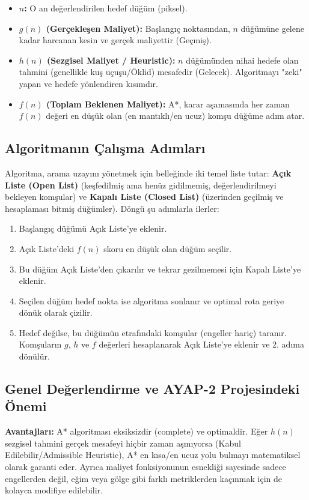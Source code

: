 \documentclass[12pt,a4paper]{article}
\begin{document}
\begin{itemize}
    \item \textbf{$n$:} O an değerlendirilen hedef düğüm (piksel).
    \item \textbf{$g(n)$ (Gerçekleşen Maliyet):} Başlangıç noktasından, $n$ düğümüne gelene kadar harcanan kesin ve gerçek maliyettir (Geçmiş).
    \item \textbf{$h(n)$ (Sezgisel Maliyet / Heuristic):} $n$ düğümünden nihai hedefe olan tahmini (genellikle kuş uçuşu/Öklid) mesafedir (Gelecek). Algoritmayı "zeki" yapan ve hedefe yönlendiren kısımdır.
    \item \textbf{$f(n)$ (Toplam Beklenen Maliyet):} A*, karar aşamasında her zaman $f(n)$ değeri en düşük olan (en mantıklı/en ucuz) komşu düğüme adım atar.
\end{itemize}

\subsection{Algoritmanın Çalışma Adımları}
Algoritma, arama uzayını yönetmek için belleğinde iki temel liste tutar: \textbf{Açık Liste (Open List)} (keşfedilmiş ama henüz gidilmemiş, değerlendirilmeyi bekleyen komşular) ve \textbf{Kapalı Liste (Closed List)} (üzerinden geçilmiş ve hesaplaması bitmiş düğümler). Döngü şu adımlarla ilerler:
\begin{enumerate}
    \item Başlangıç düğümü Açık Liste'ye eklenir.
    \item Açık Liste'deki $f(n)$ skoru en düşük olan düğüm seçilir.
    \item Bu düğüm Açık Liste'den çıkarılır ve tekrar gezilmemesi için Kapalı Liste'ye eklenir.
    \item Seçilen düğüm hedef nokta ise algoritma sonlanır ve optimal rota geriye dönük olarak çizilir.
    \item Hedef değilse, bu düğümün etrafındaki komşular (engeller hariç) taranır. Komşuların $g$, $h$ ve $f$ değerleri hesaplanarak Açık Liste'ye eklenir ve 2. adıma dönülür.
\end{enumerate}

\subsection{Genel Değerlendirme ve AYAP-2 Projesindeki Önemi}
\textbf{Avantajları:} A* algoritması eksiksizdir (complete) ve optimaldir. Eğer $h(n)$ sezgisel tahmini gerçek mesafeyi hiçbir zaman aşmıyorsa (Kabul Edilebilir/Admissible Heuristic), A* en kısa/en ucuz yolu bulmayı matematiksel olarak garanti eder. Ayrıca maliyet fonksiyonunun esnekliği sayesinde sadece engellerden değil, eğim veya gölge gibi farklı metriklerden kaçınmak için de kolayca modifiye edilebilir.
\end{document}
